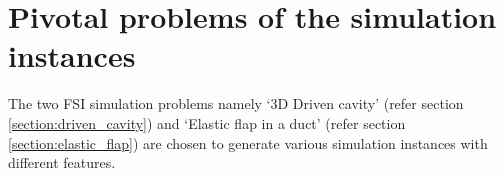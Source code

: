 



    
\section{Pivotal problems of the simulation instances}
\label{section:simulation_problem}


The two FSI simulation problems namely ‘3D Driven cavity’ (refer section \ref{section:driven_cavity}) and ‘Elastic flap in a duct’ (refer section \ref{section:elastic_flap}) are chosen to generate various simulation instances with different features.
 
